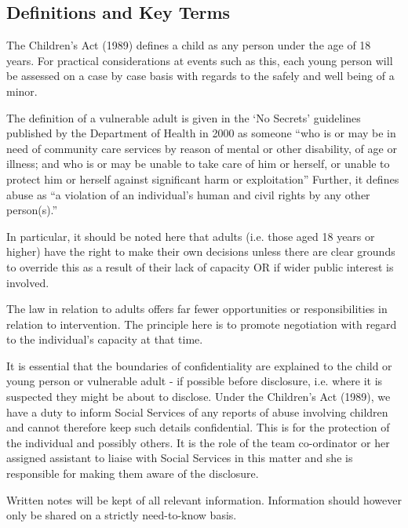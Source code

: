 \subsection{Definitions and Key Terms}

The Children's Act (1989) defines a child as any person under the age of 18
years. For practical considerations at events such as this, each young person
will be assessed on a case by case basis with regards to the safely and well
being of a minor.

The definition of a vulnerable adult is given in the `No Secrets' guidelines
published by the Department of Health in 2000 as someone ``who is or may be in
need of community care services by reason of mental or other disability, of age
or illness; and who is or may be unable to take care of him or herself, or
unable to protect him or herself against significant harm or exploitation''
Further, it defines abuse as ``a violation of an individual's human and civil
rights by any other person(s).''

In particular, it should be noted here that adults (i.e. those aged 18 years or
higher) have the right to make their own decisions unless there are clear
grounds to override this as a result of their lack of capacity OR if wider
public interest is involved.

The law in relation to adults offers far fewer opportunities or
responsibilities in relation to intervention. The principle here is to promote
negotiation with regard to the individual's capacity at that time.

It is essential that the boundaries of confidentiality are explained to the
child or young person or vulnerable adult - if possible before disclosure, i.e.
where it is suspected they might be about to disclose. Under the Children's Act
(1989), we have a duty to inform Social Services of any reports of abuse
involving children and cannot therefore keep such details confidential. This is
for the protection of the individual and possibly others. It is the role of the
team co-ordinator or her assigned assistant to liaise with Social Services in
this matter and she is responsible for making them aware of the disclosure.

Written notes will be kept of all relevant information. Information should
however only be shared on a strictly need-to-know basis.
